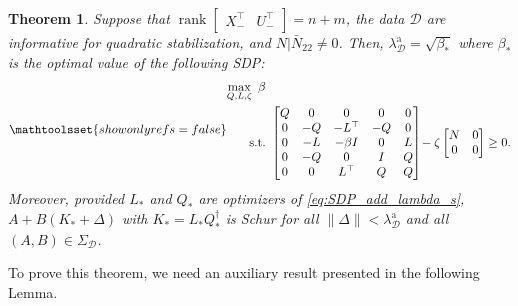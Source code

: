 \documentclass[9pt,shortpaper,twoside,web]{ieeecolor}
\DeclareMathOperator{\rank}{rank}
\newcommand{\mac}[1]{\mathcal{#1}}
\newtheorem{theorem}{Theorem}
\begin{document}
\begin{theorem}
\label{thm:add_lambda}
Suppose that $\rank\begin{bmatrix}
        X^\top_- & U^\top_-
    \end{bmatrix}=n+m$, the data $\mac{D}$ are informative for quadratic stabilization, and $N|\bar{N}_{22}\neq0$. Then, $\lambda^\text{a}_\mac{D}=\sqrt{\beta_*}$ where $\beta_*$ is the optimal value of the following SDP:
    \begin{subequations}
    \mathtoolsset{showonlyrefs=false}
    \label{eq:SDP_add_lambda_s}
    \begin{align}
    \label{eq:SDP_add_lambda_s(a)}
        \max_{Q,L,\zeta} \ \beta & \\ 
    \label{eq:SDP_add_lambda_s(b)}
        \text{s.t.} & \ \begin{bmatrix}
            Q & 0 & 0 & 0 & 0\\
            0 & -Q & -L^\top & -Q & 0\\
            0 & -L & -\beta I & 0 & L\\
            0 & -Q & 0 & I & Q\\
            0 & 0 & L^\top & Q & Q 
        \end{bmatrix}\!-\zeta\begin{bmatrix}
            N & 0 \\ 0 & 0
        \end{bmatrix} \geq 0.
    \end{align}
    \end{subequations} Moreover, provided $L_*$ and $Q_*$ are optimizers of \eqref{eq:SDP_add_lambda_s}, \mbox{$A+B(K_*+\Delta)$} with $K_*=L_*Q_*^\dagger$ is Schur for all $\|\Delta\| < \lambda^\text{a}_\mac{D}$ and all $(A,B) \in \Sigma_\mac{D}$.
\end{theorem}

To prove this theorem, we need an auxiliary result presented in the following Lemma.
\end{document}
